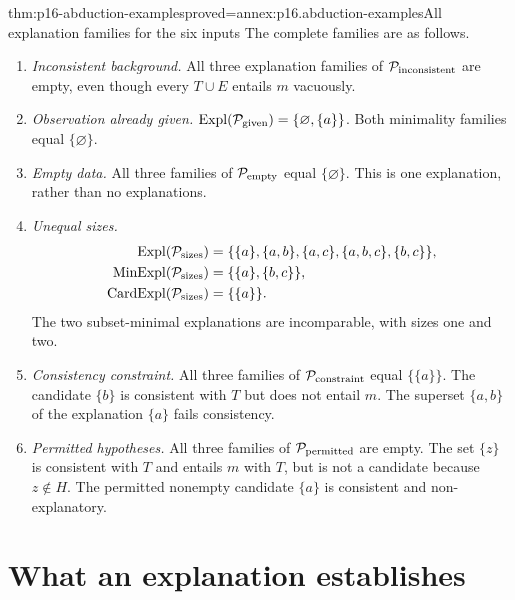 \begin{hbtheorem}{thm:p16-abduction-examples}{proved=annex:p16.abduction-examples}{All explanation families for the six inputs}
The complete families are as follows.
\begin{enumerate}
\item \emph{Inconsistent background.} All three explanation families of
      \(\mathcal P_{\rm inconsistent}\) are empty, even though every
      \(T\cup E\) entails \(m\) vacuously.
\item \emph{Observation already given.}
      \(\operatorname{Expl}(\mathcal P_{\rm given})
          =\{\varnothing,\{a\}\}\).
      Both minimality families equal \(\{\varnothing\}\).
\item \emph{Empty data.} All three families of
      \(\mathcal P_{\rm empty}\) equal \(\{\varnothing\}\).
      This is one explanation, rather than no explanations.
\item \emph{Unequal sizes.}
      \[
      \begin{aligned}
       \operatorname{Expl}(\mathcal P_{\rm sizes})
         &=\{\{a\},\{a,b\},\{a,c\},\{a,b,c\},\{b,c\}\},\\
       \operatorname{MinExpl}(\mathcal P_{\rm sizes})
         &=\{\{a\},\{b,c\}\},\\
       \operatorname{CardExpl}(\mathcal P_{\rm sizes})
         &=\{\{a\}\}.
      \end{aligned}
      \]
      The two subset-minimal explanations are incomparable, with sizes
      one and two.
\item \emph{Consistency constraint.} All three families of
      \(\mathcal P_{\rm constraint}\) equal \(\{\{a\}\}\).
      The candidate \(\{b\}\) is consistent with \(T\) but does
      not entail \(m\). The superset \(\{a,b\}\) of the explanation
      \(\{a\}\) fails consistency.
\item \emph{Permitted hypotheses.} All three families of
      \(\mathcal P_{\rm permitted}\) are empty. The set \(\{z\}\)
      is consistent with \(T\) and entails \(m\) with \(T\), but
      is not a candidate because \(z\notin H\). The permitted
      nonempty candidate \(\{a\}\) is consistent and non-explanatory.
\end{enumerate}
\end{hbtheorem}

\section{What an explanation establishes}
\label{sec:p16-abduction-interpretation}

